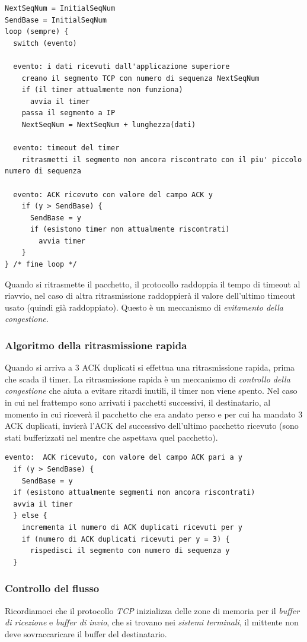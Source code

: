 \begin{lstlisting}
NextSeqNum = InitialSeqNum
SendBase = InitialSeqNum
loop (sempre) {
  switch (evento)

  evento: i dati ricevuti dall'applicazione superiore
    creano il segmento TCP con numero di sequenza NextSeqNum
    if (il timer attualmente non funziona)
      avvia il timer
    passa il segmento a IP
    NextSeqNum = NextSeqNum + lunghezza(dati)

  evento: timeout del timer
    ritrasmetti il segmento non ancora riscontrato con il piu' piccolo numero di sequenza
  
  evento: ACK ricevuto con valore del campo ACK y
    if (y > SendBase) {
      SendBase = y
      if (esistono timer non attualmente riscontrati)
        avvia timer
    }
} /* fine loop */
\end{lstlisting}
Quando si ritrasmette il pacchetto, il protocollo raddoppia il tempo di timeout al riavvio, nel caso di altra ritrasmissione raddoppierà il valore dell'ultimo timeout usato (quindi già raddoppiato). Questo è un meccanismo di \textit{evitamento della congestione}.

\subsubsection*{Algoritmo della ritrasmissione rapida}
Quando si arriva a 3 ACK duplicati si effettua una ritrasmissione rapida, prima che scada il timer. La ritrasmissione rapida è un meccanismo di \textit{controllo della congestione} che aiuta a evitare ritardi inutili, il timer non viene spento.
Nel caso in cui nel frattempo sono arrivati i pacchetti successivi, il destinatario, al momento in cui riceverà il pacchetto che era andato perso e per cui ha mandato 3 ACK duplicati, invierà l'ACK del successivo dell'ultimo pacchetto ricevuto (sono stati bufferizzati nel mentre che aspettava quel pacchetto).

\begin{lstlisting}
evento:  ACK ricevuto, con valore del campo ACK pari a y
  if (y > SendBase) {
    SendBase = y 
  if (esistono attualmente segmenti non ancora riscontrati)
  avvia il timer
  } else {
    incrementa il numero di ACK duplicati ricevuti per y
    if (numero di ACK duplicati ricevuti per y = 3) {
      rispedisci il segmento con numero di sequenza y
  }
\end{lstlisting}

\subsubsection{Controllo del flusso}
Ricordiamoci che il protocollo \textit{TCP} inizializza delle zone di memoria per il \textit{buffer di ricezione} e \textit{buffer di invio}, che si trovano nei \textit{sistemi terminali}, il mittente non deve sovraccaricare il buffer del destinatario. 

